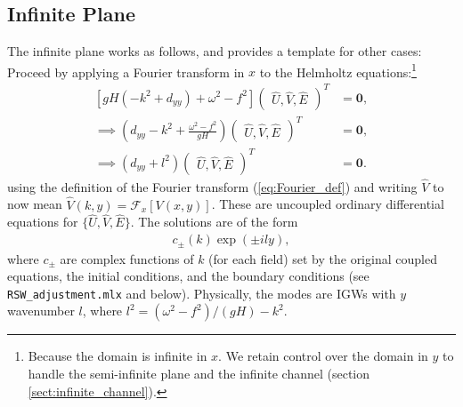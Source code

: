 \documentclass[10pt,reqno]{amsart}
\newcommand{\bfz}{{\mathbf 0}}
\begin{document}
\subsection{Infinite Plane}
\label{sect:infinite_plane}
The infinite plane works as follows, and provides a template for other cases:
Proceed by applying a Fourier transform in $x$ to the Helmholtz equations:\footnote{Because the domain is infinite in $x$. We retain control over the domain in $y$ to handle the semi-infinite plane and the infinite channel (section \ref{sect:infinite_channel}).}
\begin{align}
\left[ g H \left( -k^2 + d_{yy} \right) + \omega^2 - f^2 \right]
\begin{pmatrix}
\hat{U}, \hat{V}, \hat{E}
\end{pmatrix}^T & = \bfz,    \\
\implies
\left( d_{yy}  - k^2 + \frac{\omega^2 - f^2}{g H}\right) 
\begin{pmatrix}
\hat{U}, \hat{V}, \hat{E}\end{pmatrix}^T& = \bfz ,   \\
\implies
\left( d_{yy}  + l^2 \right) 
\begin{pmatrix}
\hat{U}, \hat{V}, \hat{E}\end{pmatrix}^T & = \bfz .   
\label{eq:infinite_x_Helmholtz}
\end{align}
using the definition of the Fourier transform (\ref{eq:Fourier_def}) and writing $\hat{V}$ to now mean $\hat{V}(k,y) = {\mathcal F}_x [ V(x,y) ]$.
These are uncoupled ordinary differential equations for $\{ \hat{U}, \hat{V}, \hat{E} \}$.
The solutions are of the form
\begin{align}
c_\pm (k) \exp \left( \pm i l y \right) ,  
\end{align}
where $c_\pm$ are complex functions of $k$ (for each field) set by the original coupled equations, the initial conditions, and the boundary conditions (see \texttt{RSW\_adjustment.mlx} and below).
Physically, the modes are IGWs with $y$ wavenumber $l$, where $l^2 = (\omega^2 - f^2)/(gH) - k^2$.
\end{document}

